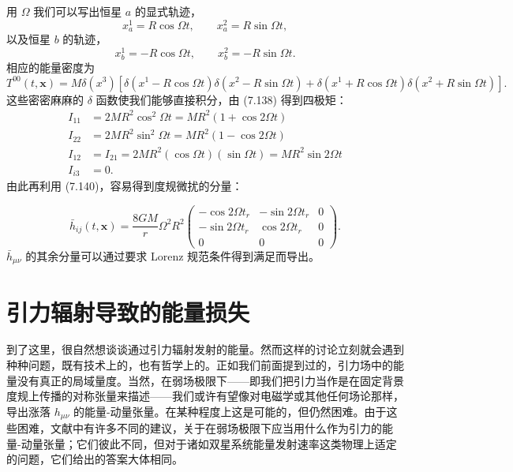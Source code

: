 用 $\Omega$ 我们可以写出恒星 $a$ 的显式轨迹，
\begin{equation*}
x^{1}_{a} = R\cos\Omega t, \qquad x^{2}_{a} = R\sin\Omega t,
\tag{7.145}
\end{equation*}
以及恒星 $b$ 的轨迹，
\begin{equation*}
x^{1}_{b} = -R\cos\Omega t, \qquad x^{2}_{b} = -R\sin\Omega t.
\tag{7.146}
\end{equation*}
相应的能量密度为
\begin{equation*}
T^{00}(t, \mathbf{x}) = M\delta(x^{3})\left[\delta(x^{1} - R\cos\Omega t)\delta(x^{2} - R\sin\Omega t) + \delta(x^{1} + R\cos\Omega t)\delta(x^{2} + R\sin\Omega t)\right].
\tag{7.147}
\end{equation*}
这些密密麻麻的 $\delta$ 函数使我们能够直接积分，由 (7.138) 得到四极矩：
\begin{align*}
I_{11} &= 2MR^{2}\cos^{2}\Omega t = MR^{2}(1 + \cos 2\Omega t) \\
I_{22} &= 2MR^{2}\sin^{2}\Omega t = MR^{2}(1 - \cos 2\Omega t) \\
I_{12} &= I_{21} = 2MR^{2}(\cos\Omega t)(\sin\Omega t) = MR^{2}\sin 2\Omega t \\
I_{i3} &= 0.
\tag{7.148}
\end{align*}
由此再利用 (7.140)，容易得到度规微扰的分量：


\begin{equation*}
\bar{h}_{ij}(t, \mathbf{x}) = \frac{8GM}{r}\Omega^{2}R^{2}
\begin{pmatrix}
-\cos 2\Omega t_r & -\sin 2\Omega t_r & 0 \\
-\sin 2\Omega t_r & \cos 2\Omega t_r & 0 \\
0 & 0 & 0
\end{pmatrix}.
\tag{7.149}
\end{equation*}
$\bar{h}_{\mu\nu}$ 的其余分量可以通过要求 Lorenz 规范条件得到满足而导出。

\section{引力辐射导致的能量损失}

到了这里，很自然想谈谈通过引力辐射发射的能量。然而这样的讨论立刻就会遇到种种问题，既有技术上的，也有哲学上的。正如我们前面提到过的，引力场中的能量没有真正的局域量度。当然，在弱场极限下——即我们把引力当作是在固定背景度规上传播的对称张量来描述——我们或许有望像对电磁学或其他任何场论那样，导出涨落 $h_{\mu\nu}$ 的能量-动量张量。在某种程度上这是可能的，但仍然困难。由于这些困难，文献中有许多不同的建议，关于在弱场极限下应当用什么作为引力的能量-动量张量；它们彼此不同，但对于诸如双星系统能量发射速率这类物理上适定的问题，它们给出的答案大体相同。

